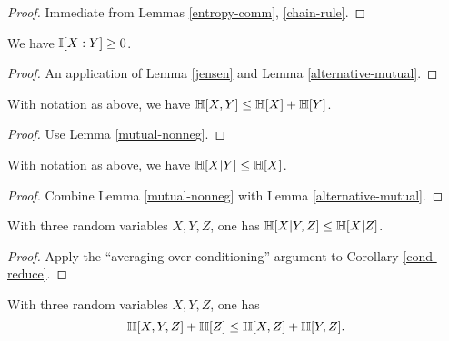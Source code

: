 \begin{proof}
  \leanok
  Immediate from Lemmas \ref{entropy-comm}, \ref{chain-rule}.
\end{proof}

\begin{lemma}
  \label{mutual-nonneg}
  \leanok
  We have $\mathbb{I}[X:Y] \geq 0$.
\end{lemma}

\begin{proof}  \leanok An application of Lemma \ref{jensen} and Lemma \ref{alternative-mutual}.
\end{proof}

\begin{corollary}[Subadditivity]
  \label{subadditive}
  \leanok
  With notation as above, we have $\mathbb{H}[X,Y] \leq \mathbb{H}[X] + \mathbb{H}[Y]$.
\end{corollary}

\begin{proof}
  \leanok
  Use Lemma \ref{mutual-nonneg}.
\end{proof}

\begin{corollary}
  \label{cond-reduce}
  \leanok
  With notation as above, we have $\mathbb{H}[X|Y] \leq \mathbb{H}[X]$.
\end{corollary}
\begin{proof}
  \leanok
  Combine Lemma \ref{mutual-nonneg} with Lemma \ref{alternative-mutual}.
\end{proof}

\begin{corollary}[Submodularity]\label{submodularity}
  \leanok
  With three random variables $X,Y,Z$, one has $\mathbb{H}[X|Y,Z] \leq \mathbb{H}[X|Z]$.
\end{corollary}

\begin{proof} \leanok Apply the ``averaging over conditioning'' argument to Corollary \ref{cond-reduce}.
\end{proof}

\begin{corollary}\label{alt-submodularity}
  \leanok
  With three random variables $X,Y,Z$, one has
  $$ \mathbb{H}[X,Y,Z] + \mathbb{H}[Z] \leq \mathbb{H}[X,Z] + \mathbb{H}[Y,Z].$$
\end{corollary}

